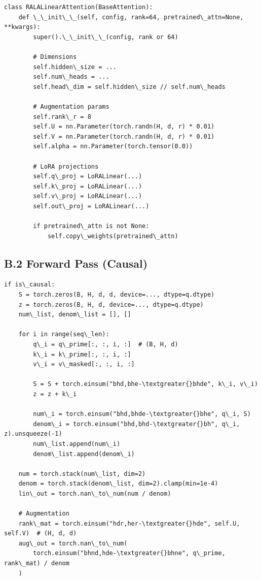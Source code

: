 \begin{lstlisting}
class RALALinearAttention(BaseAttention):
    def \_\_init\_\_(self, config, rank=64, pretrained\_attn=None, **kwargs):
        super().\_\_init\_\_(config, rank or 64)
        
        # Dimensions
        self.hidden\_size = ...
        self.num\_heads = ...
        self.head\_dim = self.hidden\_size // self.num\_heads
        
        # Augmentation params
        self.rank\_r = 8
        self.U = nn.Parameter(torch.randn(H, d, r) * 0.01)
        self.V = nn.Parameter(torch.randn(H, d, r) * 0.01)
        self.alpha = nn.Parameter(torch.tensor(0.0))
        
        # LoRA projections
        self.q\_proj = LoRALinear(...)
        self.k\_proj = LoRALinear(...)
        self.v\_proj = LoRALinear(...)
        self.out\_proj = LoRALinear(...)
        
        if pretrained\_attn is not None:
            self.copy\_weights(pretrained\_attn)
\end{lstlisting}

\subsection{B.2 Forward Pass (Causal)}

\begin{lstlisting}
if is\_causal:
    S = torch.zeros(B, H, d, d, device=..., dtype=q.dtype)
    z = torch.zeros(B, H, d, device=..., dtype=q.dtype)
    num\_list, denom\_list = [], []
    
    for i in range(seq\_len):
        q\_i = q\_prime[:, :, i, :]  # (B, H, d)
        k\_i = k\_prime[:, :, i, :]
        v\_i = v\_masked[:, :, i, :]
        
        S = S + torch.einsum("bhd,bhe-\textgreater{}bhde", k\_i, v\_i)
        z = z + k\_i
        
        num\_i = torch.einsum("bhd,bhde-\textgreater{}bhe", q\_i, S)
        denom\_i = torch.einsum("bhd,bhd-\textgreater{}bh", q\_i, z).unsqueeze(-1)
        num\_list.append(num\_i)
        denom\_list.append(denom\_i)
    
    num = torch.stack(num\_list, dim=2)
    denom = torch.stack(denom\_list, dim=2).clamp(min=1e-4)
    lin\_out = torch.nan\_to\_num(num / denom)
    
    # Augmentation
    rank\_mat = torch.einsum("hdr,her-\textgreater{}hde", self.U, self.V)  # (H, d, d)
    aug\_out = torch.nan\_to\_num(
        torch.einsum("bhnd,hde-\textgreater{}bhne", q\_prime, rank\_mat) / denom
    )
\end{lstlisting}

